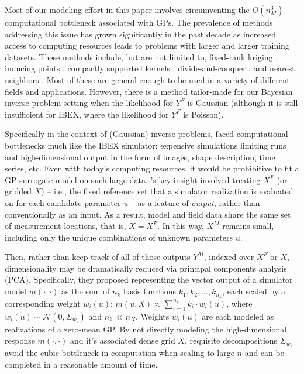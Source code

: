 \documentclass[11pt]{article}
\begin{document}
Most of our modeling effort in this paper involves circumventing the $O(n_M^3)$
computational bottleneck associated with GPs. The prevalence of methods
addressing this issue has grown significantly in the past decade as increased
access to computing resources leads to problems with larger and larger training
datasets. These methods include, but are not limited to, fixed-rank kriging
\citep{cressie2008fixed}, inducing points \citep{banerjee2008gaussian},
compactly supported kernels \citep{kaufman2011efficient}, divide-and-conquer
\citep{gramacy2015local}, and nearest neighbors
\citep{datta2016hierarchical, wu2022variational}. Most of these are general
enough to be used in a variety of different fields and applications.
{\color{red}However, there is a method tailor-made for our Bayesian inverse problem
setting when the likelihood for $Y^F$ is Gaussian (although it is still
insufficient for IBEX, where the likelihood for $Y^F$ is Poisson).}

Specifically in the context of (Gaussian) inverse problems,
\citet{higdoncalib2008} faced computational bottlenecks much like the IBEX
simulator: expensive simulations limiting runs and high-dimensional output in
the form of images, shape description, time series, etc. Even with today's
computing resources, it would be prohibitive to fit a GP surrogate model on such
large data. \citeauthor{higdoncalib2008}'s key insight involved treating $X^F$
(or gridded $X$) -- i.e., the fixed reference set that a simulator realization
is evaluated on for each candidate parameter $u$ -- as a feature of {\em
output}, rather than conventionally as an input. As a result, model and field
data share the same set of measurement locations, that is, $X = X^F$. In this
way, $X^M$ remains small, including only the unique combinations of unknown
parameters $u$.

Then, rather than keep track of all of those outputs $Y^M$, indexed over $X^F$
or $X$, dimensionality may be dramatically reduced via principal components
analysis (PCA). Specifically, they proposed representing the vector output of a
simulator model $m(\cdot,\cdot)$ as the sum of $n_k$ basis functions $k_1, k_2,
\ldots , k_{n_k}$, each scaled by a corresponding weight $w_i(u)$: $m(u, X)
\approx \sum_{i=1}^{n_k}  k_i \cdot w_i (u)$, where $w_i(u) \sim \mathcal{N}( 0,
\Sigma_{w_i})$ and $n_k \ll n_X$. Weights $w_i(u)$ are each modeled as
realizations of a zero-mean GP. By not directly modeling the high-dimensional
response $m(\cdot,\cdot)$ and it's associated dense grid $X$, requisite
decompositions $\Sigma_{w_i}$ avoid the cubic bottleneck in computation when
scaling to large $n$ and can be completed in a reasonable amount of time.
\end{document}
